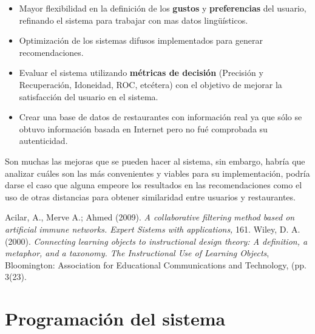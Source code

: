 \documentclass[12pt,letterpaper,oneside] {memoir}
\begin{document}
\begin{itemize}
\item Mayor flexibilidad en la definición de los \textbf{gustos} y \textbf{preferencias} del usuario, refinando el sistema para trabajar con mas datos lingüísticos.
\item Optimización de los sistemas difusos implementados para generar recomendaciones.
\item Evaluar el sistema utilizando \textbf{métricas de decisión} (Precisión y Recuperación, Idoneidad, ROC, etcétera) con el objetivo de mejorar la satisfacción del usuario en el sistema.
\item Crear una base de datos de restaurantes con información real ya que sólo se obtuvo información basada en Internet pero no fué comprobada su autenticidad.
\end{itemize}
Son muchas las mejoras que se pueden hacer al sistema, sin embargo, habría que analizar cuáles son las más convenientes y viables para su implementación, podría darse el caso que alguna empeore los resultados en las recomendaciones como el uso de otras distancias para obtener similaridad entre usuarios y restaurantes.

%
%
\begin{thebibliography}{99}

  Acilar, A., Merve A.; Ahmed (2009). \textit{A collaborative filtering method based on artificial immune networks. Expert Sistems with applications,} 161.
  Wiley, D. A. (2000). \textit{Connecting learning objects to instructional design theory: A definition, a metaphor, and a taxonomy. The Instructional Use of Learning Objects}, Bloomington: Association for Educational Communications and Technology, (pp. 3(23).



\end{thebibliography}

\appendix

\chapter{Programación del sistema}
\end{document}
